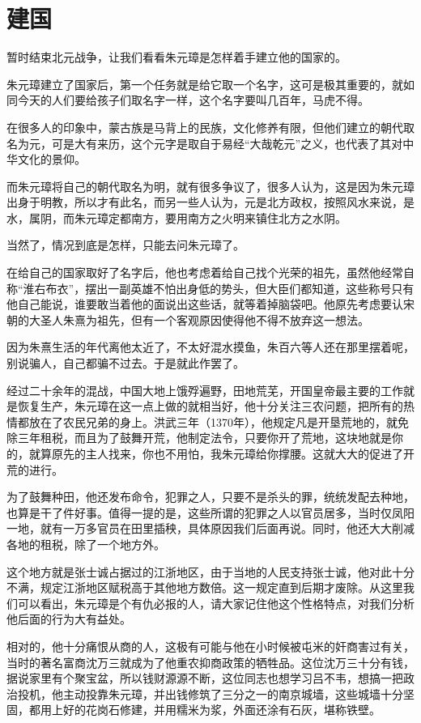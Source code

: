 \section{建国}
\ifnum{}
	\begin{multicols}{\theparacolNo}
		\fi
		暂时结束北元战争，让我们看看朱元璋是怎样着手建立他的国家的。

		朱元璋建立了国家后，第一个任务就是给它取一个名字，这可是极其重要的，就如同今天的人们要给孩子们取名字一样，这个名字要叫几百年，马虎不得。

		在很多人的印象中，蒙古族是马背上的民族，文化修养有限，但他们建立的朝代取名为元，可是大有来历，这个元字是取自于易经“大哉乾元”之义，也代表了其对中华文化的景仰。

		而朱元璋将自己的朝代取名为明，就有很多争议了，很多人认为，这是因为朱元璋出身于明教，所以才有此名，而另一些人认为，元是北方政权，按照风水来说，是水，属阴，而朱元璋定都南方，要用南方之火明来镇住北方之水阴。

		当然了，情况到底是怎样，只能去问朱元璋了。

		在给自己的国家取好了名字后，他也考虑着给自己找个光荣的祖先，虽然他经常自称“淮右布衣”，摆出一副英雄不怕出身低的势头，但大臣们都知道，这些称号只有他自己能说，谁要敢当着他的面说出这些话，就等着掉脑袋吧。他原先考虑要认宋朝的大圣人朱熹为祖先，但有一个客观原因使得他不得不放弃这一想法。

		因为朱熹生活的年代离他太近了，不太好混水摸鱼，朱百六等人还在那里摆着呢，别说骗人，自己都骗不过去。于是就此作罢了。

		经过二十余年的混战，中国大地上饿殍遍野，田地荒芜，开国皇帝最主要的工作就是恢复生产，朱元璋在这一点上做的就相当好，他十分关注三农问题，把所有的热情都放在了农民兄弟的身上。洪武三年（1370年），他规定凡是开垦荒地的，就免除三年租税，而且为了鼓舞开荒，他制定法令，只要你开了荒地，这块地就是你的，就算原先的主人找来，你也不用怕，我朱元璋给你撑腰。这就大大的促进了开荒的进行。

		为了鼓舞种田，他还发布命令，犯罪之人，只要不是杀头的罪，统统发配去种地，也算是干了件好事。值得一提的是，这些所谓的犯罪之人以官员居多，当时仅凤阳一地，就有一万多官员在田里插秧，具体原因我们后面再说。同时，他还大大削减各地的租税，除了一个地方外。

		这个地方就是张士诚占据过的江浙地区，由于当地的人民支持张士诚，他对此十分不满，规定江浙地区赋税高于其他地方数倍。这一规定直到后期才废除。从这里我们可以看出，朱元璋是个有仇必报的人，请大家记住他这个性格特点，对我们分析他后面的行为大有益处。

		相对的，他十分痛恨从商的人，这极有可能与他在小时候被屯米的奸商害过有关，当时的著名富商沈万三就成为了他重农抑商政策的牺牲品。这位沈万三十分有钱，据说家里有个聚宝盆，所以钱财源源不断，这位同志也想学习吕不韦，想搞一把政治投机，他主动投靠朱元璋，并出钱修筑了三分之一的南京城墙，这些城墙十分坚固，都用上好的花岗石修建，并用糯米为浆，外面还涂有石灰，堪称铁壁。


\end{multicols}
